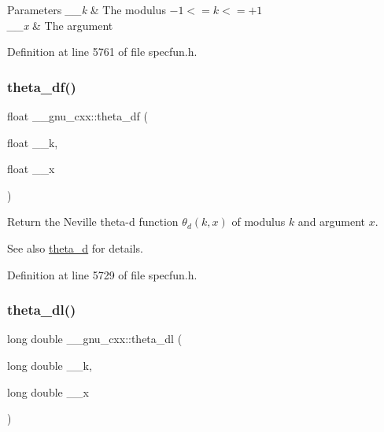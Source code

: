 \begin{DoxyParams}{Parameters}
{\em \+\_\+\+\_\+k} & The modulus $ -1 <= k <= +1 $ \\
\hline
{\em \+\_\+\+\_\+x} & The argument \\
\hline
\end{DoxyParams}


Definition at line 5761 of file specfun.\+h.

\mbox{\label{group__gnu__math__spec__func_gad2dc6fcaf54d25cbfaad082623941118}} 
\subsubsection{\texorpdfstring{theta\+\_\+df()}{theta\_df()}}
{\footnotesize\ttfamily float \+\_\+\+\_\+gnu\+\_\+cxx\+::theta\+\_\+df (\begin{DoxyParamCaption}\item[{float}]{\+\_\+\+\_\+k,  }\item[{float}]{\+\_\+\+\_\+x }\end{DoxyParamCaption})\hspace{0.3cm}{\ttfamily [inline]}}

Return the Neville theta-\/d function $ \theta_d(k,x) $ of modulus $ k $ and argument $ x $.

\begin{DoxySeeAlso}{See also}
\hyperlink{group__gnu__math__spec__func_ga258edb995137d9e6344b3cd750266d74}{theta\+\_\+d} for details. 
\end{DoxySeeAlso}


Definition at line 5729 of file specfun.\+h.

\mbox{\label{group__gnu__math__spec__func_gacce4474168b9638ebeaad1c7b351fa04}} 
\subsubsection{\texorpdfstring{theta\+\_\+dl()}{theta\_dl()}}
{\footnotesize\ttfamily long double \+\_\+\+\_\+gnu\+\_\+cxx\+::theta\+\_\+dl (\begin{DoxyParamCaption}\item[{long double}]{\+\_\+\+\_\+k,  }\item[{long double}]{\+\_\+\+\_\+x }\end{DoxyParamCaption})\hspace{0.3cm}{\ttfamily [inline]}}

